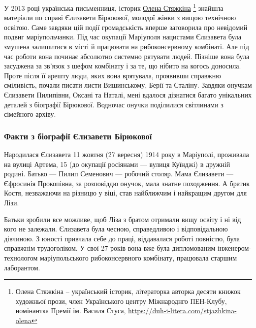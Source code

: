 
У 2013 році українська письменниця, історик
\href{https://duh-i-litera.com/stjazhkina-olena}{Олена Стяжкіна}%
\footnote{Олена Стяжкіна – український історик, літераторка авторка десяти
книжок художньої прози, член Українського центру Міжнароднго ПЕН-Клубу,
номінантка Премії ім. Василя Стуса,
\url{https://duh-i-litera.com/stjazhkina-olena}} знайшла матеріали по справі
Єлизавети Бірюкової, молодої жінки з вищою технічною освітою. Саме завдяки цій
події громадськість вперше заговорила про невідомий подвиг маріупольчанки. Під
час окупації Маріуполя нацистами Єлизавета була змушена залишитися в місті й
працювати на рибоконсервному комбінаті. Але під час роботи вона починає
абсолютно системно рятувати людей. Пізніше вона була засуджена за зв'язок з
шефом комбінату і за те, що нібито на когось доносила. Проте після її арешту
люди, яких вона врятувала, проявивши справжню сміливість, почали писати листи
Вишинському, Берії та Сталіну. Завдяки онучкам Єлизавети Пилипівни, Оксані та
Наталі, мені вдалося дізнатися багато унікальних деталей з біографії Бірюкової.
Водночас онучки поділилися світлинами з сімейного архіву.




\subsubsection{Факти з біографії Єлизавети Бірюкової}

Народилася Єлизавета 11 жовтня (27 вересня) 1914 року в Маріуполі, проживала на
вулиці Артема, 15 (до окупації росіянами — вулиця Куїнджі) в дружній родині.
Батько — Пилип Семенович — робочий столяр. Мама Єлизавети — Єфросинія
Прокопівна, за розповіддю онучок, мала знатне походження. А братик Костя,
незважаючи на різницю у віці, став найближчим і найкращим другом для Лізи.

Батьки зробили все можливе, щоб Ліза з братом отримали вищу освіту і ні від
кого не залежали. Єлизавета була чесною, справедливою і відповідальною
дівчиною. З юності привчала себе до праці, віддавалася роботі повністю, була
справжнім трудоголіком. У свої 27 років вона вже була дипломованим
інженером-технологом маріупольського рибоконсервного комбінату, працювала
старшим лаборантом.

